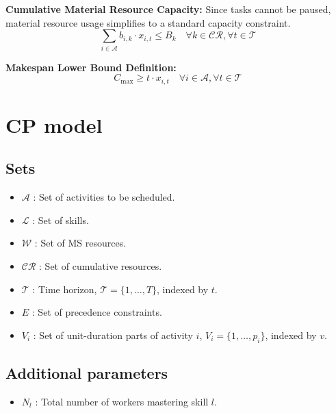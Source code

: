 \documentclass[preprint, authoryear,11pt]{elsarticle}
\begin{document}
\noindent \textbf{Cumulative Material Resource Capacity:} Since tasks cannot be paused, material resource usage simplifies to a standard capacity constraint.
\begin{equation}
    \sum_{i \in \mathcal{A}} b_{i,k} \cdot x_{i,t} \leq B_k \quad \forall k \in \mathcal{CR}, \forall t \in \mathcal{T}
\end{equation}

\noindent \textbf{Makespan Lower Bound Definition:} 
\begin{equation}
    C_{\max} \geq t \cdot x_{i,t} \quad \forall i \in \mathcal{A}, \forall t \in \mathcal{T}
\end{equation}

\section{CP model}
\label{sec:cp}

\subsection{Sets}
\begin{itemize}
    \item $\mathcal{A}$ : Set of activities to be scheduled.
    \item $\mathcal{L}$ : Set of skills.
    \item $\mathcal{W}$ : Set of MS resources.
    \item $\mathcal{CR}$ : Set of cumulative resources. 
    \item $\mathcal{T}$ : Time horizon, $\mathcal{T} = \{1, \dots, T\}$, indexed by $t$.
    \item $E$ : Set of precedence constraints.
    \item $V_i$ : Set of unit-duration parts of activity $i$, $V_i = \{1, \dots, p_i\}$, indexed by $v$.
\end{itemize}

\subsection{Additional parameters}
\begin{itemize}
    \item $N_l$ : Total number of workers mastering skill $l$.
\end{itemize}
\end{document}

